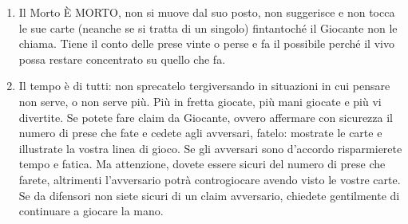 \documentclass[../corsofiori.tex]{subfiles}
\begin{document}
\begin{enumerate}
\item Il Morto \`E MORTO, non si muove dal suo posto, non suggerisce e non tocca le sue carte (neanche se si tratta di
    un singolo) fintantoché il Giocante non le chiama. Tiene il conto delle prese vinte o perse e fa il possibile perché
    il vivo possa restare concentrato su quello che fa.
\item Il tempo è di tutti: non sprecatelo tergiversando in situazioni in cui pensare non serve, o non serve più. Più in
    fretta giocate, più mani giocate e più vi divertite. Se potete fare claim da Giocante, ovvero affermare con sicurezza il numero
    di prese che fate e cedete agli avversari, fatelo: mostrate le carte e illustrate la vostra linea di gioco. Se gli
    avversari sono d'accordo risparmierete tempo e fatica. Ma attenzione, dovete essere sicuri del numero di prese che
    farete, altrimenti l'avversario potrà controgiocare avendo visto le vostre carte. Se da difensori non siete sicuri
    di un claim avversario, chiedete gentilmente di continuare a giocare la mano.
\end{enumerate}
\end{document}
